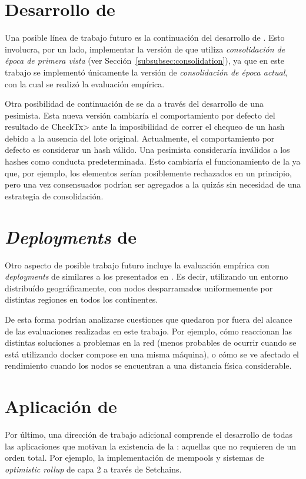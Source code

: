 \section{Desarrollo de \hashchain}
Una posible línea de trabajo futuro es la continuación del desarrollo
de \hashchain.
Esto involucra, por un lado, implementar la versión de \hashchain que utiliza
\textit{consolidación de época de primera vista} (ver Sección~\ref{subsubsec:consolidation}),
ya que en este trabajo se implementó únicamente la versión
de \textit{consolidación de época actual}, con la cual se realizó la evaluación
empírica.

%
Otra posibilidad de continuación de \hashchain se da a través del desarrollo de una
\hashchain pesimista.
Esta nueva versión cambiaría el comportamiento por defecto del resultado de \<CheckTx>
ante la imposibilidad de correr el chequeo de un hash debido a la ausencia
del lote original.
Actualmente, el comportamiento por defecto es considerar un hash válido.
Una \hashchain pesimista consideraría inválidos a los hashes como conducta predeterminada.
Esto cambiaría el funcionamiento de la \hashchain ya que, por ejemplo, los elementos serían
posiblemente rechazados en un principio, pero una vez consensuados podrían ser agregados
a la \setchain quizás sin necesidad de una estrategia de consolidación.

\section{\textit{Deployments} de \hashchain}
Otro aspecto de posible trabajo futuro incluye la evaluación empírica con
\textit{deployments}
de \hashchain similares a los presentados en \cite{tendermint.design}.
Es decir, utilizando un entorno distribuído geográficamente, con nodos desparramados
uniformemente por distintas regiones en todos los continentes.

De esta forma podrían analizarse cuestiones que quedaron por fuera del alcance de las
evaluaciones realizadas en este trabajo. Por ejemplo, cómo reaccionan las distintas
soluciones a problemas en la red (menos probables de ocurrir cuando se está utilizando
docker compose en una misma máquina), o cómo se ve afectado el rendimiento cuando
los nodos se encuentran a una distancia física considerable. 

\section{Aplicación de \hashchain}
Por último, una dirección de trabajo adicional comprende el desarrollo de todas las
aplicaciones que motivan la existencia de la \setchain: aquellas que no requieren de
un orden total.
Por ejemplo, la implementación de mempools y sistemas de
\textit{optimistic rollup} de capa 2 a través de Setchains.

